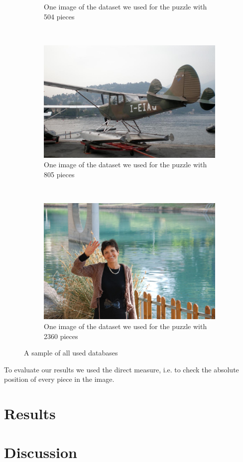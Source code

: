 \documentclass[]{report}
\begin{document}
\begin{figure}
\begin{subfigure}[b]{0.45\textwidth}
		\caption{One image of the dataset we used for the puzzle with 504 pieces}
		\label{img:540}
	\end{subfigure}
	~
	\begin{subfigure}[b]{0.45\textwidth}
		\includegraphics[width=\textwidth]{../imData/805/1.jpg}
		\caption{One image of the dataset we used for the puzzle with 805 pieces}
		\label{img:805}
	\end{subfigure}
	~
	\begin{subfigure}[b]{0.45\textwidth}
		\includegraphics[width=\textwidth]{../imData/2360/1.jpg}
		\caption{One image of the dataset we used for the puzzle with 2360 pieces}
		\label{img:2360}
	\end{subfigure}

	\caption{A sample of all used databases}
	\label{fig:database}
\end{figure}

To evaluate our results we used the direct measure, i.e. to check the absolute position of every piece in the image.


\chapter{Results}

\chapter{Discussion}

\nocite{*}



\end{document}
